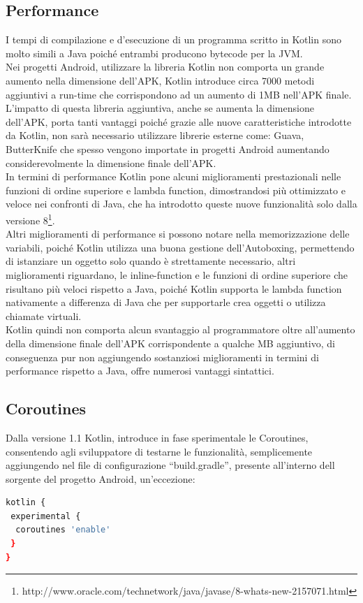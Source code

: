 \subsection{Performance}
I tempi di compilazione e d'esecuzione di un programma scritto in Kotlin sono molto simili a Java poiché entrambi producono bytecode per la JVM.\\
Nei progetti Android, utilizzare la libreria Kotlin non comporta un grande aumento nella dimensione dell'APK, Kotlin introduce circa 7000 metodi aggiuntivi a run-time che corrispondono ad un aumento di 1MB nell'APK finale.\\
L'impatto di questa libreria aggiuntiva, anche se aumenta la dimensione dell'APK, porta tanti vantaggi poiché grazie alle nuove caratteristiche introdotte da Kotlin, non sarà necessario utilizzare librerie esterne come: Guava, ButterKnife che spesso vengono importate in progetti Android aumentando considerevolmente la dimensione finale dell'APK.\\
In termini di performance Kotlin pone alcuni miglioramenti prestazionali nelle funzioni di ordine superiore e lambda function, dimostrandosi più ottimizzato e veloce nei confronti di Java, che ha introdotto queste nuove funzionalità solo dalla versione 8\footnote{http://www.oracle.com/technetwork/java/javase/8-whats-new-2157071.html}.\\
Altri miglioramenti di performance si possono notare nella memorizzazione delle variabili, poiché Kotlin utilizza una buona gestione dell'Autoboxing, permettendo di istanziare un oggetto solo quando è strettamente necessario, altri miglioramenti riguardano, le inline-function e le funzioni di ordine superiore che risultano più veloci rispetto a Java, poiché Kotlin supporta le lambda function nativamente a differenza di Java che per supportarle crea oggetti o utilizza chiamate virtuali.\\
Kotlin quindi non comporta alcun svantaggio al programmatore oltre all'aumento della dimensione finale dell'APK corrispondente a qualche MB aggiuntivo, di conseguenza pur non aggiungendo sostanziosi miglioramenti in termini di performance rispetto a Java, offre numerosi vantaggi sintattici.

\newpage




\subsection{Coroutines}
Dalla versione 1.1 Kotlin, introduce in fase sperimentale le Coroutines, consentendo agli sviluppatore di testarne le funzionalità, semplicemente aggiungendo nel file di configurazione ``build.gradle'', presente all'interno dell sorgente del progetto Android, un'eccezione:
\begin{lstlisting}[language=bash,caption={Gradle Coroutines }]
kotlin {
 experimental {
  coroutines 'enable'
 }
}
\end{lstlisting}

